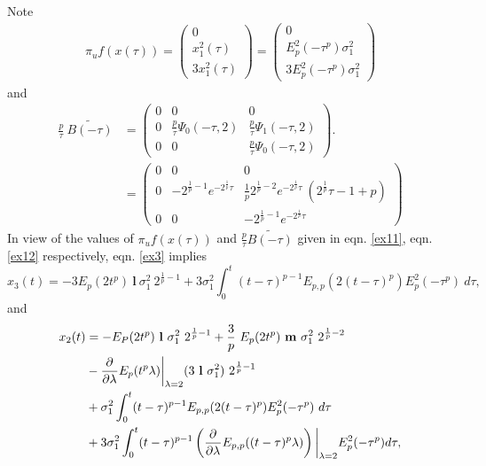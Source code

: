 \begin{exmp}
 Note \begin{align}\label{ex11}
 	\pi_uf(x(\tau)) = \begin{pmatrix}
 		0 \\ x_1^2(\tau) \\ 3 x_1^2 (\tau)
 	\end{pmatrix} = \begin{pmatrix}
 	0 \\ E_{p}^{2}(-\tau^p)\sigma_1^2 \\ 3 E_{p}^{2}(-\tau^p)\sigma_1^2 
 \end{pmatrix}
 \end{align} 
 and 
 \begin{align} \label{ex12}
 	\frac{p}{\tau}~ \widetilde{B(-\tau)} &= \begin{pmatrix}
 		0 & 0 & 0 \\ 0 & \frac{p}{\tau}\Psi_{0}(-\tau,2) & \frac{p}{\tau}\Psi_1(-\tau,2) \\ 0 & 0 & \frac{p}{\tau}\Psi_{0}(-\tau,2)
 	\end{pmatrix}.\\
 	\nonumber
 	&= \begin{pmatrix}
 	0 & 0 & 0 \\ 0 & -2^{\frac{1}{p}-1} e^{-2^{\frac{1}{p}}\tau} & \frac{1}{p} 2^{\frac{1}{p}-2} e^{-2^{\frac{1}{p}}\tau} ~(2^{\frac{1}{p}}\tau -1 + p) \\
 	0 & 0 & -2^{\frac{1}{p}-1} e^{-2^{\frac{1}{p}}\tau}
 	\end{pmatrix}
 \end{align}
 In view of the values of $\pi_u f(x(\tau))$ and $\frac{p}{\tau} \widetilde{B(-\tau)}$ given in eqn. \eqref{ex11}, eqn. \eqref{ex12} respectively,  eqn. \eqref{ex3} implies
 \begin{dmath} \label{ex4}
 	x_3(t) = -3 E_p(2 t^p) ~ \mathbf{l} ~ \sigma_1 ^2 ~2^{\frac{1}{p}-1} + 3 \sigma_1^2 \int_{0}^{t} (t-\tau)^{p-1} E_{p,p}(2(t-\tau)^p) E^2_p(-\tau^p)~ d\tau,
 \end{dmath}
 and
 \begin{align}\label{ex5}
 \begin{split}
 	x_2(t) &= - E_P(2 t^p) ~\mathbf{l}~\sigma_1^2~2^{\frac{1}{p}-1} + \frac{3}{p}~ E_p(2 t^p)~ \mathbf{m}~ \sigma_1^2~2^{\frac{1}{p}-2} \\&- \pder{}{\lambda}\ml{p}{\lambda}\bigg\vert_{\lambda =2} (3 ~\mathbf{l} ~\sigma_1^2) ~ 2^{\frac{1}{p}-1}  \\&+\sigma_1^2 \int_{0}^{t} (t-\tau)^{p-1} E_{p,p}(2(t-\tau)^p) E_p^2(-\tau^p)~ d\tau \\&+ 3\sigma_1^2 \int_{0}^{t} (t-\tau)^{p-1} \left( \pder{}{\lambda} E_{p,p}((t-\tau)^p \lambda)\right) \bigg\vert_{\lambda=2} E_p^2(-\tau^p) d\tau,

\end{split}
\end{align}
\end{exmp}
